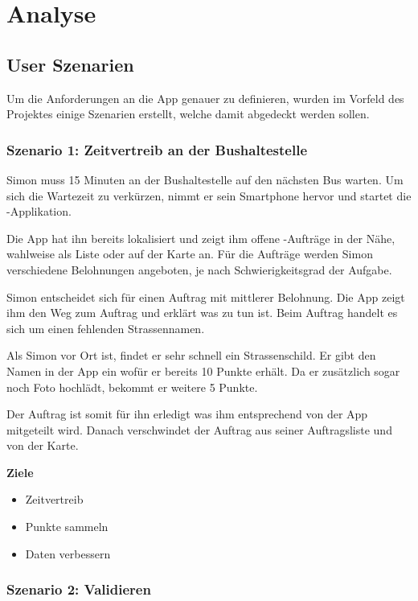 \section{Analyse}

\subsection{User Szenarien}
\label{kort-user-szenarien}

Um die Anforderungen an die App genauer zu definieren, wurden im Vorfeld des Projektes einige Szenarien erstellt, welche damit abgedeckt werden sollen.

\subsubsection{Szenario 1: Zeitvertreib an der Bushaltestelle}

Simon muss 15 Minuten an der Bushaltestelle auf den nächsten Bus warten.
Um sich die Wartezeit zu verkürzen, nimmt er sein Smartphone hervor und startet die \kort{}-Applikation.

Die App hat ihn bereits lokalisiert und zeigt ihm offene -Aufträge in der Nähe, wahlweise als Liste oder auf der Karte an.
Für die Aufträge werden Simon verschiedene Belohnungen angeboten, je nach Schwierigkeitsgrad der Aufgabe.

Simon entscheidet sich für einen Auftrag mit mittlerer Belohnung.
Die App zeigt ihm den Weg zum Auftrag und erklärt was zu tun ist. Beim Auftrag handelt es sich um einen fehlenden Strassennamen.

Als Simon vor Ort ist, findet er sehr schnell ein Strassenschild.
Er gibt den Namen in der App ein wofür er bereits 10 Punkte erhält.
Da er zusätzlich sogar noch Foto hochlädt, bekommt er weitere 5 Punkte.

Der Auftrag ist somit für ihn erledigt was ihm entsprechend von der App mitgeteilt wird.
Danach verschwindet der Auftrag aus seiner Auftragsliste und von der Karte.

\textbf{Ziele}
\begin{itemize}
\item Zeitvertreib
\item Punkte sammeln
\item Daten verbessern
\end{itemize}

\subsubsection{Szenario 2: Validieren}

